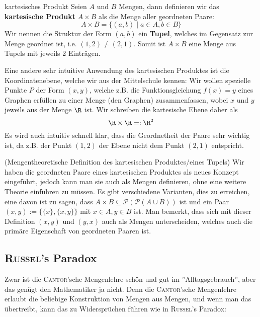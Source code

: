\begin{definition}{kartesisches Produkt}{}
Seien $A$ und $B$ Mengen, dann definieren wir das \textbf{kartesische Produkt} $A\times B$ als die Menge aller geordneten Paare:
$$A\times B = \{(a, b) \mid a \in A, b \in B\}$$
Wir nennen die Struktur der Form $(a, b)$ ein \textbf{Tupel}, welches im Gegensatz zur Menge geordnet ist, i.e. $(1,2) \neq (2,1)$. Somit ist $A\times B$ eine Menge aus Tupels mit jeweils 2 Einträgen.
\end{definition}

\begin{example}
Eine andere sehr intuitive Anwendung des kartesischen Produktes ist die Koordinatenebene, welche wir aus der Mittelschule kennen: Wir wollen spezielle Punkte $P$ der Form $(x,y)$, welche z.B. die Funktionsgleichung $f(x) = y$ eines Graphen erfüllen zu einer Menge (den Graphen) zusammenfassen, wobei $x$ und $y$ jeweils aus der Menge $\R$ ist. Wir schreiben die kartesische Ebene daher als
$$\R \times \R =: \R^2$$
Es wird auch intuitiv schnell klar, dass die Geordnetheit der Paare sehr wichtig ist, da z.B. der Punkt $(1,2)$ der Ebene nicht dem Punkt $(2,1)$ entspricht.
\end{example}

\begin{remark}
(Mengentheoretische Definition des kartesischen Produktes/eines Tupels) Wir haben die geordneten Paare eines kartesischen Produktes als neues Konzept eingeführt, jedoch kann man sie auch als Mengen definieren, ohne eine weitere Theorie einführen zu müssen. Es gibt verschiedene Varianten, dies zu erreichen, eine davon ist zu sagen, dass $A \times B \subseteq \mathcal{P}(\mathcal{P}(A \cup B))$ ist und ein Paar $(x, y) := \{\{x\},\{x, y\}\}$ mit $x \in A, y \in B$ ist. Man bemerkt, dass sich mit dieser Definition $(x, y)$ und $(y, x)$ auch als Mengen unterscheiden, welches auch die primäre Eigenschaft von geordneten Paaren ist.
\end{remark}

\subsection{\textsc{Russel}'s Paradox}
Zwar ist die \textsc{Cantor}'sche Mengenlehre schön und gut im ''Alltagsgebrauch'', aber das genügt den Mathematiker ja nicht. Denn die \textsc{Cantor}'sche Mengenlehre erlaubt die beliebige Konstruktion von Mengen aus Mengen, und wenn man das übertreibt, kann das zu Widersprüchen führen wie in \textsc{Russel}'s Paradox:

